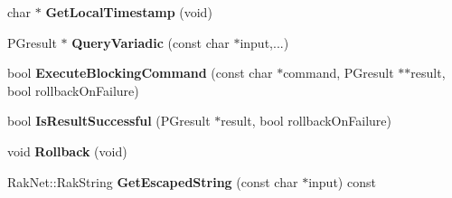 \begin{DoxyCompactItemize}
\item 
\hypertarget{class_postgre_s_q_l_interface_a50903829c1ca03cada78ba3432cbcdc9}{char $\ast$ {\bfseries Get\-Local\-Timestamp} (void)}\label{class_postgre_s_q_l_interface_a50903829c1ca03cada78ba3432cbcdc9}

\item 
\hypertarget{class_postgre_s_q_l_interface_a64221c9df6cbe51daedebbe84771973b}{P\-Gresult $\ast$ {\bfseries Query\-Variadic} (const char $\ast$input,...)}\label{class_postgre_s_q_l_interface_a64221c9df6cbe51daedebbe84771973b}

\item 
\hypertarget{class_postgre_s_q_l_interface_ab62653db173f9d87b5e69fc0f5de4cb9}{bool {\bfseries Execute\-Blocking\-Command} (const char $\ast$command, P\-Gresult $\ast$$\ast$result, bool rollback\-On\-Failure)}\label{class_postgre_s_q_l_interface_ab62653db173f9d87b5e69fc0f5de4cb9}

\item 
\hypertarget{class_postgre_s_q_l_interface_a08e84ef50b92e38e038c9579ed83bedb}{bool {\bfseries Is\-Result\-Successful} (P\-Gresult $\ast$result, bool rollback\-On\-Failure)}\label{class_postgre_s_q_l_interface_a08e84ef50b92e38e038c9579ed83bedb}

\item 
\hypertarget{class_postgre_s_q_l_interface_addd65c7a8120fe778706086bf875c4c4}{void {\bfseries Rollback} (void)}\label{class_postgre_s_q_l_interface_addd65c7a8120fe778706086bf875c4c4}

\item 
\hypertarget{class_postgre_s_q_l_interface_a230ee730d970e7b4b41351e1cea4407e}{Rak\-Net\-::\-Rak\-String {\bfseries Get\-Escaped\-String} (const char $\ast$input) const }\label{class_postgre_s_q_l_interface_a230ee730d970e7b4b41351e1cea4407e}

\end{DoxyCompactItemize}
